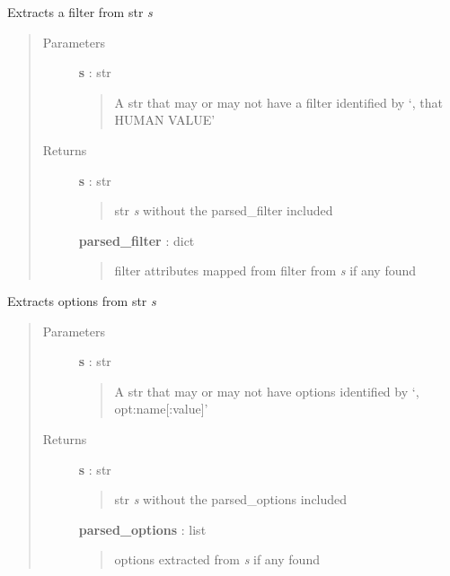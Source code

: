 \documentclass[letterpaper,10pt,english]{sphinxmanual}
\begin{document}
\begin{fulllineitems}
\label{pytan.utils:pytan.utils.extract_filter}
Extracts a filter from str \emph{s}
\begin{quote}\begin{description}
\item[{Parameters}] \leavevmode
\textbf{s} : str
\begin{quote}

A str that may or may not have a filter identified by `, that HUMAN VALUE'
\end{quote}

\item[{Returns}] \leavevmode
\textbf{s} : str
\begin{quote}

str \emph{s} without the parsed\_filter included
\end{quote}

\textbf{parsed\_filter} : dict
\begin{quote}

filter attributes mapped from filter from \emph{s} if any found
\end{quote}

\end{description}\end{quote}

\end{fulllineitems}


\begin{fulllineitems}
\label{pytan.utils:pytan.utils.extract_options}
Extracts options from str \emph{s}
\begin{quote}\begin{description}
\item[{Parameters}] \leavevmode
\textbf{s} : str
\begin{quote}

A str that may or may not have options identified by `, opt:name{[}:value{]}'
\end{quote}

\item[{Returns}] \leavevmode
\textbf{s} : str
\begin{quote}

str \emph{s} without the parsed\_options included
\end{quote}

\textbf{parsed\_options} : list
\begin{quote}

options extracted from \emph{s} if any found
\end{quote}

\end{description}\end{quote}

\end{fulllineitems}
\end{document}
